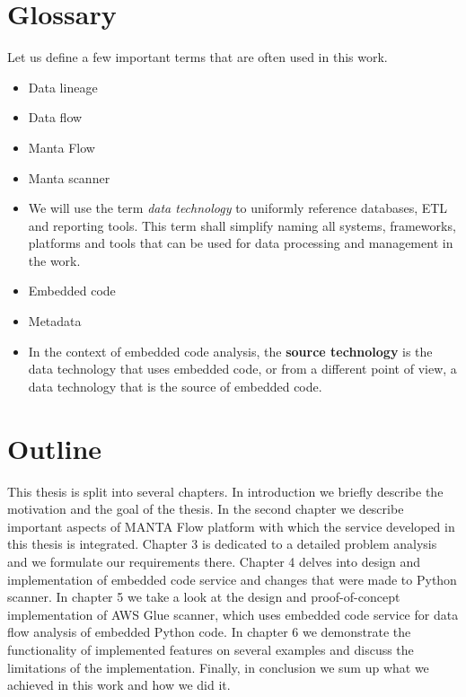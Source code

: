 \section{Glossary}

Let us define a few important terms that are often used in this work.
\begin{itemize}
    \item Data lineage
    \item Data flow
    \item Manta Flow
    \item Manta scanner
    \item We will use the term \textit{data technology} to uniformly reference databases, ETL and reporting tools. This term shall simplify naming all systems, frameworks, platforms and tools that can be used for data processing and management in the work.
    \item Embedded code
    \item Metadata
    \item In the context of embedded code analysis, the \textbf{source technology} is the data technology that uses embedded code, or from a different point of view, a data technology that is the source of embedded code.
\end{itemize}

\section{Outline}

This thesis is split into several chapters. In introduction we briefly describe the motivation and the goal of the thesis. In the second chapter we describe important aspects of MANTA Flow platform with which the service developed in this thesis is integrated. Chapter 3 is dedicated to a detailed problem analysis and we formulate our requirements there. Chapter 4 delves into design and implementation of embedded code service and changes that were made to Python scanner. In chapter 5 we take a look at the design and proof-of-concept implementation of AWS Glue scanner, which uses embedded code service for data flow analysis of embedded Python code. In chapter 6 we demonstrate the functionality of implemented features on several examples and discuss the limitations of the implementation. Finally, in conclusion we sum up what we achieved in this work and how we did it.
